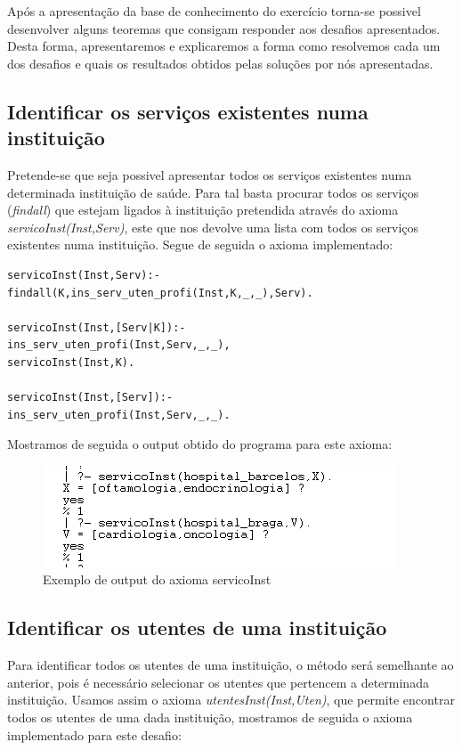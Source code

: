 Após a apresentação da base de conhecimento do exercício torna-se possivel desenvolver alguns teoremas que consigam responder aos desafios apresentados. Desta forma, apresentaremos e explicaremos a forma como resolvemos cada um dos desafios e quais os resultados obtidos pelas soluções por nós apresentadas. 

\subsection{Identificar os serviços existentes numa instituição}
Pretende-se que seja possivel apresentar todos os serviços existentes numa determinada instituição de saúde. Para tal basta procurar todos os serviços (\textit{findall}) que estejam ligados à instituição pretendida através do axioma \textit{servicoInst(Inst,Serv)}, este que nos devolve uma lista com todos os serviços existentes numa instituição.  
Segue de seguida o axioma implementado: 
\begin{verbatim}
servicoInst(Inst,Serv):-
findall(K,ins_serv_uten_profi(Inst,K,_,_),Serv).      

servicoInst(Inst,[Serv|K]):- 
ins_serv_uten_profi(Inst,Serv,_,_),
servicoInst(Inst,K).

servicoInst(Inst,[Serv]):- 
ins_serv_uten_profi(Inst,Serv,_,_).
\end{verbatim}

Mostramos de seguida o output obtido do programa para este axioma: 

\begin{figure}[<+htpb+>]
	\centering
	\includegraphics[scale=0.9]{answer1.png}
	\caption{Exemplo de output do axioma servicoInst}
	\label{p3:fig:output1}
\end{figure}

\subsection{Identificar os utentes de uma instituição}
Para identificar todos os utentes de uma instituição, o método será semelhante ao anterior, pois é necessário selecionar os utentes que pertencem a determinada instituição. Usamos assim o axioma \textit{utentesInst(Inst,Uten)}, que permite encontrar todos os utentes de uma dada instituição, mostramos de seguida o axioma implementado para este desafio: 

